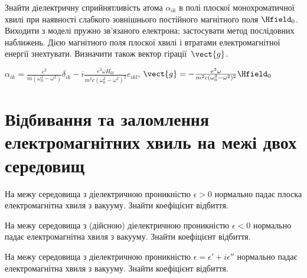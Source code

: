 \begin{problem}%
Знайти діелектричну сприйнятливість атома $\alpha_{ik}$ в полі плоскої монохроматичної хвилі при наявності слабкого зовнішнього постійного магнітного поля $\Hfield_0$. Виходити з моделі пружно зв'язаного електрона; застосувати метод послідовних наближень. Дією магнітного поля плоскої хвилі і втратами електромагнітної енергії знехтувати. Визначити також вектор гірації~$\vect{g}$.
\begin{solution}
	$\alpha_{ik} = \frac{e^2}{m(\omega_0^2 - \omega^2)}\delta_{ik} - i \frac{e^3\omega H_{0l}}{m^2c(\omega_0^2 - \omega^2)^2}e_{ikl}$, $\vect{g} = -\frac{e^3\omega}{m^2c(\omega_0^2 - \omega^2)^2}\Hfield_0$
\end{solution}
\end{problem}


\section{Відбивання та заломлення електромагнітних хвиль на межі двох середовищ}

\begin{problem}
На межу середовища з діелектричною проникністю $\epsilon > 0 $  нормально падає плоска електромагнітна хвиля з вакууму. Знайти коефіцієнт відбиття.
\end{problem}

\begin{problem}
На межу середовища з (дійсною) діелектричною проникністю  $\epsilon < 0 $  нормально падає електромагнітна хвиля з вакууму. Знайти коефіцієнт відбиття.
\end{problem}

\begin{problem}
На межу середовища з діелектричною проникністю $\epsilon = \epsilon' + i\epsilon''$  нормально падає електромагнітна хвиля з вакууму. Знайти коефіцієнт відбиття.
\end{problem}



